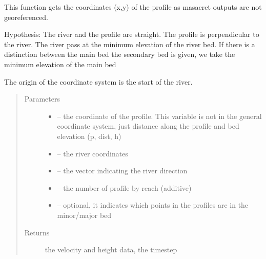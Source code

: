 \documentclass[letterpaper,10pt,english]{sphinxmanual}
\begin{document}
\begin{fulllineitems}
\label{\detokenize{index:src.mascaret.profil_coord_non_georef}}
This function gets the coordinates (x,y) of the profile as masacret outputs are not georeferenced.

Hypothesis: The river and the profile are straight. The profile is perpendicular to the river.
The river pass at the minimum elevation of the river bed. If there is a distinction between the main bed the
secondary bed is given, we take the minimum elevation of the main bed

The origin of the coordinate system is the start of the river.
\begin{quote}\begin{description}
\item[{Parameters}] \leavevmode\begin{itemize}
\item {} 
 -- the coordinate of the profile. This variable is not in the general coordinate system,
just distance along the profile and bed elevation (p, dist, h)

\item {} 
 -- the river coordinates

\item {} 
 -- the vector indicating the river direction

\item {} 
 -- the number of profile by reach (additive)

\item {} 
 -- optional, it indicates which points in the profiles are in the minor/major bed

\end{itemize}

\item[{Returns}] \leavevmode
the velocity and height data, the timestep

\end{description}\end{quote}

\end{fulllineitems}

\end{document}
